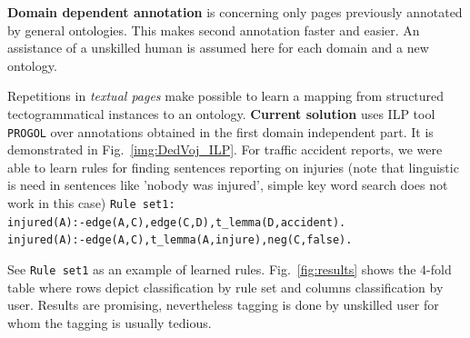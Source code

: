 \documentclass{www2009-submission}
\begin{document}




\textbf{Domain dependent annotation} is concerning only pages previously annotated by general ontologies. This makes second annotation faster and easier. An assistance of a unskilled human is assumed here for each domain and a new ontology.

Repetitions in \emph{textual pages} make possible to learn a mapping from structured tectogrammatical instances to an ontology. %
{\bf Current solution} uses ILP tool \texttt{PROGOL} over annotations obtained in the first domain independent part. It is demonstrated in Fig.~\ref{img:DedVoj_ILP}. For traffic accident reports, we were able to learn rules for finding sentences reporting on injuries (note that linguistic is need in sentences like 'nobody was injured', simple key word search does not work in this case) 
\newline
\texttt{Rule set1:\\
injured(A):-edge(A,C),edge(C,D),t\_lemma(D,accident).\\
injured(A):-edge(A,C),t\_lemma(A,injure),neg(C,false).}

See \texttt{Rule set1} as an example of learned rules. Fig.~\ref{fig:results} shows the 4-fold table where rows depict classification by rule set and columns classification by user. Results are promising, nevertheless tagging is done by unskilled user for whom the tagging is usually tedious.
\end{document}
